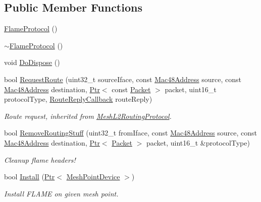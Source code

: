 \subsection*{Public Member Functions}
\begin{DoxyCompactItemize}
\item 
\hyperlink{classns3_1_1flame_1_1FlameProtocol_a31f67d87aecd0b41e77fa9f004ef3e72}{Flame\+Protocol} ()
\item 
\hyperlink{classns3_1_1flame_1_1FlameProtocol_ae1b6beee12128191c0b9b2b50e2fae46}{$\sim$\+Flame\+Protocol} ()
\item 
void \hyperlink{classns3_1_1flame_1_1FlameProtocol_a25b22891027f4b6314f9940e209bb813}{Do\+Dispose} ()
\item 
bool \hyperlink{classns3_1_1flame_1_1FlameProtocol_a70087b7d1cd62978882df6599f56bf29}{Request\+Route} (uint32\+\_\+t source\+Iface, const \hyperlink{classns3_1_1Mac48Address}{Mac48\+Address} source, const \hyperlink{classns3_1_1Mac48Address}{Mac48\+Address} destination, \hyperlink{classns3_1_1Ptr}{Ptr}$<$ const \hyperlink{classns3_1_1Packet}{Packet} $>$ packet, uint16\+\_\+t protocol\+Type, \hyperlink{classns3_1_1MeshL2RoutingProtocol_a4c415efa22789b3a3bb5538b8fcf3e6a}{Route\+Reply\+Callback} route\+Reply)
\begin{DoxyCompactList}\small\item\em Route request, inherited from \hyperlink{classns3_1_1MeshL2RoutingProtocol}{Mesh\+L2\+Routing\+Protocol}. \end{DoxyCompactList}\item 
bool \hyperlink{classns3_1_1flame_1_1FlameProtocol_ad0b9c31eff724dcd0916a1985c351db1}{Remove\+Routing\+Stuff} (uint32\+\_\+t from\+Iface, const \hyperlink{classns3_1_1Mac48Address}{Mac48\+Address} source, const \hyperlink{classns3_1_1Mac48Address}{Mac48\+Address} destination, \hyperlink{classns3_1_1Ptr}{Ptr}$<$ \hyperlink{classns3_1_1Packet}{Packet} $>$ packet, uint16\+\_\+t \&protocol\+Type)
\begin{DoxyCompactList}\small\item\em Cleanup flame headers! \end{DoxyCompactList}\item 
bool \hyperlink{classns3_1_1flame_1_1FlameProtocol_a824a540ca72c5a413ce31a2f037a8487}{Install} (\hyperlink{classns3_1_1Ptr}{Ptr}$<$ \hyperlink{classns3_1_1MeshPointDevice}{Mesh\+Point\+Device} $>$)
\begin{DoxyCompactList}\small\item\em Install F\+L\+A\+ME on given mesh point. \end{DoxyCompactList}\item 

\end{DoxyCompactItemize}
